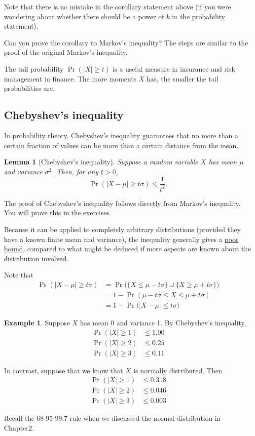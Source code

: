 \documentclass[
]{book}
\newtheorem{lemma}{Lemma}[chapter]
\theoremstyle{definition}
\theoremstyle{definition}
\newtheorem{example}{Example}[chapter]
\theoremstyle{definition}
\theoremstyle{definition}
\theoremstyle{remark}
\begin{document}
Note that there is no mistake in the corollary statement above (if you were wondering about whether there should be a power of \(k\) in the probability statement).

Can you prove the corollary to Markov's inequality? The steps are similar to the proof of the original Markov's inequality.

The tail probability \(\Pr(|X|\geq t)\) is a useful measure in insurance and
risk management in finance. The more moments \(X\) has, the smaller the
tail probabilities are.

\hypertarget{chebyshevs-inequality}{%
\subsection{Chebyshev's inequality}\label{chebyshevs-inequality}}

In probability theory, Chebyshev's inequality guarantees that no more
than a certain fraction of values can be more than a certain distance
from the mean.

\begin{lemma}[Chebyshev's inequality]
Suppose a random variable \(X\) has mean \(\mu\) and variance \(\sigma^2\). Then, for any
\(t>0\), \[\Pr(|X-\mu| \geq t\sigma) \leq \frac{1}{t^2}.\]
\end{lemma}

The proof of Chebyshev's inequality follows directly from Markov's inequality. You will prove this in the exercises.

Because it can be applied to completely arbitrary distributions (provided they have a known finite mean and variance), the inequality generally gives a \uline{poor bound}, compared to what might be deduced if more aspects are known about the distribution involved.

Note that
\begin{align*}
\Pr(|X-\mu| \geq t\sigma)
&= \Pr\big(\{ X \leq \mu - t\sigma \} \cup \{ X \geq \mu + t\sigma \}\big) \\
&= 1 - \Pr( \mu - t\sigma \leq X \leq \mu + t\sigma ) \\
&= 1 - \Pr\big(|X-\mu| \leq t\sigma\big)
\end{align*}

\begin{example}
Suppose \(X\) has mean 0 and variance 1. By Chebyshev's inequality,
\[\begin{aligned}
    \Pr(|X| \geq 1) &\leq 1.00 \\
    \Pr(|X| \geq 2) &\leq 0.25 \\
    \Pr(|X| \geq 3) &\leq 0.11 
  \end{aligned}\]

In contrast, suppose that we know that \(X\) is normally
distributed. Then \[\begin{aligned}
    \Pr(|X| \geq 1) &\leq 0.318 \\
    \Pr(|X| \geq 2) &\leq 0.046 \\
    \Pr(|X| \geq 3) &\leq 0.003 
  \end{aligned}\]

Recall the 68-95-99.7 rule when we discussed the normal distribution in Chapter2.
\end{example}
\end{document}
